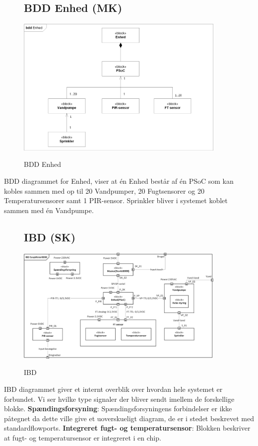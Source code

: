 \begin{figure}[H] \centering
\subsection{BDD Enhed (MK)}
{\includegraphics[width=0.9\textwidth]{filer/systemarkitektur/BDD_Enhed}}
\caption{BDD Enhed}
\label{lab:bddenhed}
\raggedright
\end{figure}
BDD diagrammet for Enhed, viser at én Enhed består af én PSoC som kan kobles sammen med op til 20 Vandpumper, 20 Fugtsensorer og 20 Temperatursensorer samt 1 PIR-sensor. Sprinkler bliver i systemet koblet sammen med én Vandpumpe.

\begin{figure}[H] \centering
\subsection{IBD (SK)}
{\includegraphics[width=0.9\textwidth]{filer/systemarkitektur/IBD}}
\caption{IBD}
\label{lab:ibd}
\raggedright
\end{figure}
IBD diagrammet giver et internt overblik over hvordan hele systemet er forbundet. Vi ser hvilke type signaler der bliver sendt imellem de forskellige blokke. \newline \newline
\textbf{Spændingsforsyning}: Spændingsforsyningens forbindelser er ikke påtegnet da dette ville give et uoverskueligt diagram, de er i stedet beskrevet med standardflowports.  \newline \newline
\textbf{Integreret fugt- og temperatursensor}: Blokken beskriver at fugt- og temperatursensor er integreret i en chip. \newline \newline

